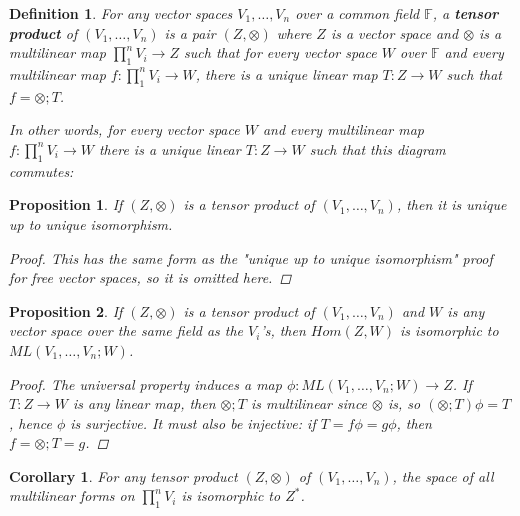 \documentclass[a4paper,14pt]{article}
\newtheorem*{prop}{Proposition}
\newtheorem*{corollary}{Corollary}
\newtheorem*{defn}{Definition}
\begin{document}
\begin{defn}
    For any vector spaces $V_1, \ldots, V_n$ over a common field $\mathbb{F}$, a \textbf{tensor product} of $(V_1, \ldots, V_n)$ is a pair $(Z, \otimes)$ where $Z$ is a vector space and $\otimes$ is a multilinear map $\prod_1^n V_i \to Z$ such that for every vector space $W$ over $\mathbb{F}$ and every multilinear map $f: \prod_1^n V_i \to W$, there is a unique linear map $T: Z \to W$ such that $f = \otimes;T$.

In other words, for every vector space $W$ and every multilinear map $f: \prod_1^n V_i \to W$ there is a unique linear $T: Z \to W$ such that this diagram commutes:

\begin{center}
\end{center}
\end{defn}

\begin{prop}
If $(Z, \otimes)$ is a tensor product of $(V_1, \ldots, V_n)$, then it is unique up to unique isomorphism.
\begin{proof}
This has the same form as the "unique up to unique isomorphism" proof for free vector spaces, so it is omitted here.
\end{proof}
\end{prop}

\begin{prop}
If $(Z, \otimes)$ is a tensor product of $(V_1, \ldots, V_n)$ and $W$ is any vector space over the same field as the $V_i$'s, then $Hom(Z, W)$ is isomorphic to $ML(V_1, \ldots, V_n; W)$.
\begin{proof}
    The universal property induces a map $\phi: ML(V_1, \ldots, V_n; W) \to Z$. If $T: Z \to W$ is any linear map, then $\otimes;T$ is multilinear since $\otimes$ is, so $(\otimes;T) \phi = T$, hence $\phi$ is surjective. It must also be injective: if $T = f \phi = g \phi$, then $f = \otimes;T = g$.
\end{proof}
\end{prop}
\begin{corollary}
For any tensor product $(Z, \otimes)$ of $(V_1, \ldots, V_n)$, the space of all multilinear forms on $\prod_1^n V_i$ is isomorphic to $Z^{\ast}$.
\end{corollary}
\end{document}

